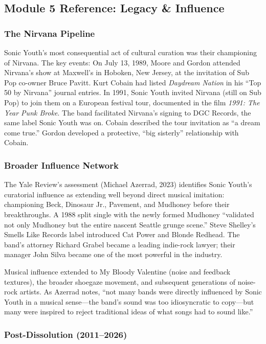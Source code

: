 \documentclass[11pt,letterpaper]{article}
\begin{document}
\subsection{Module 5 Reference: Legacy \& Influence}

\subsubsection{The Nirvana Pipeline}

Sonic Youth's most consequential act of cultural curation was their championing of Nirvana. The key events: On July 13, 1989, Moore and Gordon attended Nirvana's show at Maxwell's in Hoboken, New Jersey, at the invitation of Sub Pop co-owner Bruce Pavitt. Kurt Cobain had listed \textit{Daydream Nation} in his ``Top 50 by Nirvana'' journal entries. In 1991, Sonic Youth invited Nirvana (still on Sub Pop) to join them on a European festival tour, documented in the film \textit{1991: The Year Punk Broke}. The band facilitated Nirvana's signing to DGC Records, the same label Sonic Youth was on. Cobain described the tour invitation as ``a dream come true.'' Gordon developed a protective, ``big sisterly'' relationship with Cobain.

\subsubsection{Broader Influence Network}

The Yale Review's assessment (Michael Azerrad, 2023) identifies Sonic Youth's curatorial influence as extending well beyond direct musical imitation: championing Beck, Dinosaur Jr., Pavement, and Mudhoney before their breakthroughs. A 1988 split single with the newly formed Mudhoney ``validated not only Mudhoney but the entire nascent Seattle grunge scene.'' Steve Shelley's Smells Like Records label introduced Cat Power and Blonde Redhead. The band's attorney Richard Grabel became a leading indie-rock lawyer; their manager John Silva became one of the most powerful in the industry.

Musical influence extended to My Bloody Valentine (noise and feedback textures), the broader shoegaze movement, and subsequent generations of noise-rock artists. As Azerrad notes, ``not many bands were directly influenced by Sonic Youth in a musical sense---the band's sound was too idiosyncratic to copy---but many were inspired to reject traditional ideas of what songs had to sound like.''

\subsubsection{Post-Dissolution (2011--2026)}
\end{document}
